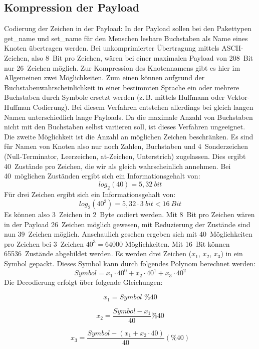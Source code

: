 \documentclass{IEEEtran}
\begin{document}
    \subsection{Kompression der Payload}
    Codierung der Zeichen in der Payload: 
    In der Payload sollen bei den Pakettypen get\_name und set\_name für den 
    Menschen lesbare Buchstaben als Name eines Knoten übertragen werden. Bei 
    unkomprimierter Übertragung mittels ASCII-Zeichen, also 8~Bit pro Zeichen, 
    wären bei einer maximalen Payload von 208~Bit nur 26~Zeichen möglich. Zur 
    Kompression des Knotennamens gibt es hier im Allgemeinen zwei Möglichkeiten. 
    Zum einen können aufgrund der Buchstabenwahrscheinlichkeit in einer 
    bestimmten Sprache ein oder mehrere Buchstaben durch Symbole ersetzt werden 
    (z.\,B. mittels Huffmann oder Vektor-Huffman Codierung). Bei diesem Verfahren 
    entstehen allerdings bei gleich langen Namen unterschiedlich lange Payloads. 
    Da die maximale Anzahl von Buchstaben nicht mit den Buchstaben selbst 
    variieren soll, ist dieses Verfahren ungeeignet. Die zweite Möglichkeit ist 
    die Anzahl an möglichen Zeichen beschränken. Es sind für Namen von Knoten 
    also nur noch Zahlen, Buchstaben und 4~Sonderzeichen (Null-Terminator, 
    Leerzeichen, at-Zeichen, Unterstrich) zugelassen. Dies ergibt 40~Zustände 
    pro Zeichen, die wir als gleich wahrscheinlich annehmen. Bei 40~möglichen 
    Zuständen ergibt sich ein Informationsgehalt von: $$log_{2}(40) = 5,32~bit$$
    Für drei Zeichen ergibt sich ein Informationsgehalt von:
    $$log_{2}(40^3) = 5,32 \cdot 3~bit < 16~Bit$$ Es können also 3~Zeichen 
    in 2~Byte codiert werden. Mit 8~Bit pro Zeichen wären in der Payload 
    26~Zeichen möglich gewesen, mit Reduzierung der Zustände sind nun 39~Zeichen 
    möglich.
    Anschaulich gesehen ergeben sich mit 40~Möglichkeiten pro Zeichen bei 
    3~Zeichen $40^3 = 64000$ Möglichkeiten. Mit 16~Bit können 65536~Zustände 
    abgebildet werden. 
    Es werden drei Zeichen ($x_{1}$, $x_{2}$, $x_{3}$) in ein Symbol gepackt. 
    Dieses Symbol kann durch folgendes Polynom berechnet werden:
    $$Symbol = x_{1} \cdot 40^{0} + x_{2} \cdot 40^{1} + x_{3} \cdot 40^{2}$$
    Die Decodierung erfolgt über folgende Gleichungen:

    $$x_{1}=Symbol \,\, \% 40$$

    $$x_{2} = \frac{Symbol - x_{1}}{40} \% 40$$
    
    $$x_{3} = \frac{Symbol - (x_{1} + x_{2} \cdot 40)}{40} (\% 40)$$
\end{document}
